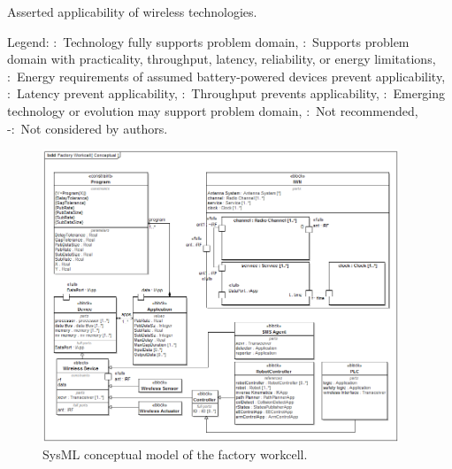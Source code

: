 \documentclass{article}
\begin{document}
		\begin{table}[htbp]
			\setlength{\tabcolsep}{1.4pt}
			\centering
			\caption{Asserted applicability of wireless technologies.}
			\label{tbl:techmap}%
			\begin{adjustbox}{width=\textwidth}
				
			\end{adjustbox}
			\vspace{3pt}
			\raggedright
			
			Legend: 
			\CIRCLE:~{Technology fully supports problem domain,}
			\LEFTcircle:~{Supports problem domain with practicality, throughput, latency, reliability, or energy limitations,}
			\lightning:~{Energy requirements of assumed battery-powered devices prevent applicability,}
			\clock:~{Latency prevent applicability,}
			\DOWNarrow:~{Throughput prevents applicability,}
			\hexstar:~{Emerging technology or evolution may support problem domain,}
			\fullmoon:~{Not recommended,}
			-:~{Not considered by authors.}
		\end{table}%
	
		\begin{figure}[!tbhp]
			\centering
			\includegraphics[width=0.95\textwidth]{images/bdd__Factory_Workcell__Conceptual}
			\caption{SysML conceptual model of the factory workcell.}
			\label{fig:sysmlex}
		\end{figure}
	
\end{document}
